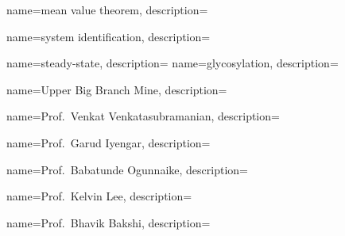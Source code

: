 	{
		name={mean value theorem},
		description={}
	}	

	{
		name={system identification},
		description={}
	}	
	
	{
		name={steady-state},
		description={}
	}		
	{
		name={glycosylation},
		description={}
	}			
	
	
	{
		name={Upper Big Branch Mine},
		description={}
	}

	{
		name={Prof.~Venkat Venkatasubramanian},
		description={}
	}

	{
		name={Prof.~Garud Iyengar},
		description={}
	}
	
	{
		name={Prof.~Babatunde Ogunnaike},
		description={}
	}

	{
		name={Prof.~Kelvin Lee},
		description={}
	}

	{
		name={Prof.~Bhavik Bakshi},
		description={}
	}








